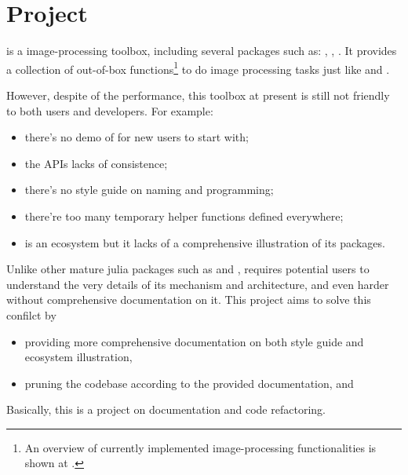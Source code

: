 
\section{Project}\label{sec:project}

\repoimages{} is a \langjulia image-processing toolbox, including several packages such as: \imagecore, \imagetransformations, \imageaxes. It provides a collection of out-of-box functions\footnote{An overview of currently implemented image-processing functionalities is shown at \apicomparison.} to do image processing tasks just like \reposcikitimage and \matlabimageprocessing.

However, despite of the performance, this toolbox at present is still not friendly to both users and developers. For example:

\begin{itemize}
    \item there's no demo of \images{} for new users to start with;
    \item the APIs lacks of consistence;
    \item there's no style guide on naming and programming;
    \item there're too many temporary helper functions defined everywhere;
    \item \images{} is an ecosystem but it lacks of a comprehensive illustration of its packages.
\end{itemize}

Unlike other mature julia packages such as \repojump and \repogpuarrays, \images{} requires potential users to understand the very details of its mechanism and architecture, and even harder without comprehensive documentation on it. This project aims to solve this confilct by

\begin{itemize}
    \item providing more comprehensive documentation on both style guide and ecosystem illustration,
    \item pruning the \images{} codebase according to the provided documentation, and
\end{itemize}

Basically, this is a project on documentation and code refactoring.
